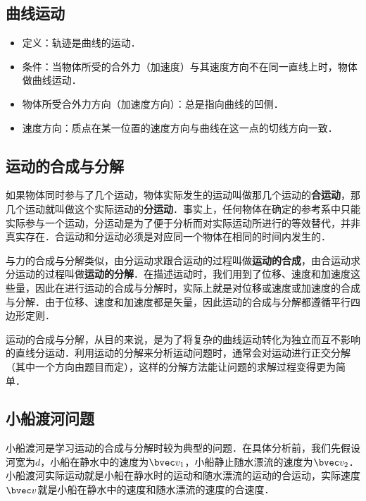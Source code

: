
\begin{issues}
\issueDraft
\issueTODO
\end{issues}

\subsection{曲线运动}

\begin{itemize}
\item 定义：轨迹是曲线的运动．
\item 条件：当物体所受的合外力（加速度）与其速度方向不在同一直线上时，物体做曲线运动．
\item 物体所受合外力方向（加速度方向）：总是指向曲线的凹侧．
\item 速度方向：质点在某一位置的速度方向与曲线在这一点的切线方向一致．
\end{itemize}

\subsection{运动的合成与分解}

如果物体同时参与了几个运动，物体实际发生的运动叫做那几个运动的\textbf{合运动}，那几个运动就叫做这个实际运动的\textbf{分运动}．事实上，任何物体在确定的参考系中只能实际参与一个运动，分运动是为了便于分析而对实际运动所进行的等效替代，并非真实存在．合运动和分运动必须是对应同一个物体在相同的时间内发生的．

与力的合成与分解类似，由分运动求跟合运动的过程叫做\textbf{运动的合成}，由合运动求分运动的过程叫做\textbf{运动的分解}．在描述运动时，我们用到了位移、速度和加速度这些量，因此在进行运动的合成与分解时，实际上就是对位移或速度或加速度的合成与分解．由于位移、速度和加速度都是矢量，因此运动的合成与分解都遵循平行四边形定则．

运动的合成与分解，从目的来说，是为了将复杂的曲线运动转化为独立而互不影响的直线分运动．利用运动的分解来分析运动问题时，通常会对运动进行正交分解（其中一个方向由题目而定），这样的分解方法能让问题的求解过程变得更为简单．

\subsection{小船渡河问题}

小船渡河是学习运动的合成与分解时较为典型的问题．在具体分析前，我们先假设河宽为$d$，小船在静水中的速度为$\bvec v_1$，小船静止随水漂流的速度为$\bvec v_2$．小船渡河实际运动就是小船在静水时的运动和随水漂流的运动的合运动，实际速度$\bvec v$就是小船在静水中的速度和随水漂流的速度的合速度．

